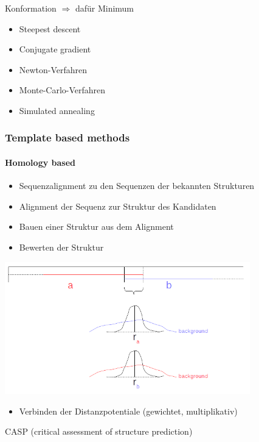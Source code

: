 Konformation $\Rightarrow$ dafür Minimum
\begin{itemize}
 \item Steepest descent
 \item Conjugate gradient
 \item Newton-Verfahren
\end{itemize}

\begin{itemize}
 \item Monte-Carlo-Verfahren
 \item Simulated annealing
\end{itemize}

\subsubsection{Template based methods}
\paragraph{Homology based}
\begin{itemize}
 \item Sequenzalignment zu den Sequenzen der bekannten Strukturen
 \item Alignment der Sequenz zur Struktur des Kandidaten
 \item Bauen einer Struktur aus dem Alignment
 \item Bewerten der Struktur
\end{itemize}

\includegraphics[width=0.8\textwidth]{lectures/160606/pix/homology.png}

\begin{itemize}
 \item Verbinden der Distanzpotentiale (gewichtet, multiplikativ)
\end{itemize}
CASP (critical assessment of structure prediction)

